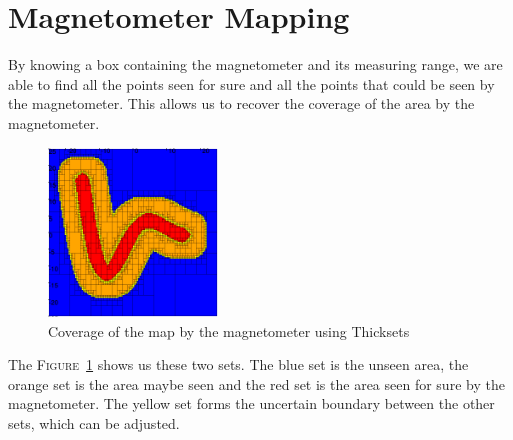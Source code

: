 \section*{Magnetometer Mapping}
    By knowing a box containing the magnetometer and its measuring range, we are able to find all the points seen for sure and all the points that could be seen by the magnetometer. This allows us to recover the coverage of the area by the magnetometer.

    \begin{figure}[!htb]
        \centering
        \includegraphics[width=0.4\textwidth]{imgs/thickset_fine.png}
        \caption{\label{fig:thickset} Coverage of the map by the magnetometer using Thicksets}
    \end{figure}

    The \textsc{Figure}~\ref{fig:thickset} shows us these two sets. The blue set is the unseen area, the orange set is the area maybe seen and the red set is the area seen for sure by the magnetometer. The yellow set forms the uncertain boundary between the other sets, which can be adjusted.